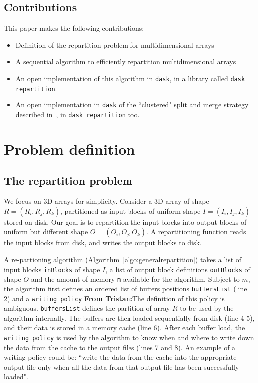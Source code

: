 \documentclass[conference]{IEEEtran}
\newcommand{\tristan}[1]{\color{orange}\textbf{From Tristan:}#1\color{black}}
\begin{document}
\subsection{Contributions}
This paper makes the following contributions:
\begin{itemize}
  \item Definition of the repartition problem for multidimensional arrays
  \item A sequential algorithm to efficiently repartition multidimensional arrays
  \item An open implementation of this algorithm in \texttt{dask},
  in a library called \texttt{dask repartition}.
  \item An open implementation in \texttt{dask} of the ``clustered" split and
  merge strategy described in~\cite{seqalgorithms}, in \texttt{dask repartition} too.
\end{itemize}

\section{Problem definition}
\subsection{The repartition problem}
We focus on 3D arrays for simplicity. Consider a 3D array of shape $R =
(R_i, R_j, R_k)$, partitioned as input blocks of uniform shape $I = (I_i,
I_j, I_k)$ stored on disk. Our goal is to repartition the input blocks into output blocks
of uniform but different shape $O = (O_i, O_j, O_k)$. A repartitioning function reads the input blocks from
disk, and writes the output blocks to disk.

A re-partioning algorithm (Algorithm~\ref{algo:generalrepartition}) takes a
list of input blocks \texttt{inBlocks} of shape $I$, a list of output block definitions
\texttt{outBlocks} of shape $O$ and the amount of memory \texttt{m}
available for the algorithm. Subject to $m$, the algorithm first defines an ordered list of buffers positions
\texttt{buffersList} (line 2) and a \texttt{writing policy} \tristan{The definition of this policy is ambiguous}.
\texttt{buffersList} defines the partition of array $R$ to be used by the algorithm internally.
The buffers are then loaded sequentially from disk
(line 4-5), and their data is stored in a memory cache (line 6). After each buffer load,
the \texttt{writing policy} is used by the algorithm to know when and where to
write down the data from the cache to the output files (lines 7 and 8). An
example of a writing policy could be:
``write the data from the cache into the appropriate output file only when all
the data from that output file has been successfully loaded".
\end{document}
